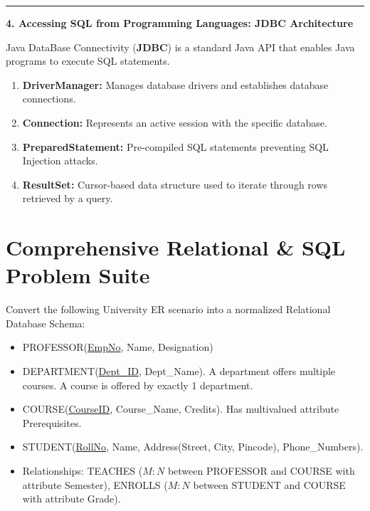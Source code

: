 \documentclass[11pt,a4paper]{article}
\newcommand{\ic}[1]{\mbox{\colorbox{AnthCodeBG}{\footnotesize\ttfamily\textcolor{AnthBlue}{#1}}}}
\newcommand{\concept}[1]{%
  \vspace{3pt}\noindent\textcolor{AnthGreen}{\rule{3.5pt}{10pt}}\enspace
  \textbf{\sffamily\color{AnthDark}#1}\par\vspace{2pt}%
}
\newenvironment{Problem}[1][Problem Scenario]{\begin{tcolorbox}[problembox, title=#1]}{\end{tcolorbox}}
\begin{document}
\concept{4. Accessing SQL from Programming Languages: JDBC Architecture}
Java DataBase Connectivity (\textbf{JDBC}) is a standard Java API that enables Java programs to execute SQL statements.
\begin{enumerate}
  \item \textbf{\ic{DriverManager}:} Manages database drivers and establishes database connections.
  \item \textbf{\ic{Connection}:} Represents an active session with the specific database.
  \item \textbf{\ic{PreparedStatement}:} Pre-compiled SQL statements preventing SQL Injection attacks.
  \item \textbf{\ic{ResultSet}:} Cursor-based data structure used to iterate through rows retrieved by a query.
\end{enumerate}

\clearpage
\section{Comprehensive Relational \& SQL Problem Suite}

\begin{Problem}[Problem 1: Synthesizing Complex ER Diagram to Relational Schema]
Convert the following University ER scenario into a normalized Relational Database Schema:
\begin{itemize}
  \item \ic{PROFESSOR}(\underline{EmpNo}, Name, Designation)
  \item \ic{DEPARTMENT}(\underline{Dept\_ID}, Dept\_Name). A department offers multiple courses. A course is offered by exactly 1 department.
  \item \ic{COURSE}(\underline{CourseID}, Course\_Name, Credits). Has multivalued attribute \ic{Prerequisites}.
  \item \ic{STUDENT}(\underline{RollNo}, Name, Address(Street, City, Pincode), Phone\_Numbers).
  \item Relationships: \ic{TEACHES} ($M:N$ between \ic{PROFESSOR} and \ic{COURSE} with attribute \ic{Semester}), \ic{ENROLLS} ($M:N$ between \ic{STUDENT} and \ic{COURSE} with attribute \ic{Grade}).
\end{itemize}
\end{Problem}
\end{document}
